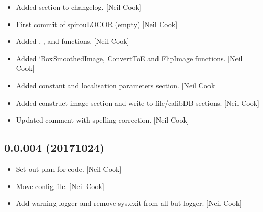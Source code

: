 \documentclass[a4paper,10pt,english]{report}
\begin{document}
\begin{itemize}
\item {} 
Added  section to changelog. {[}Neil Cook{]}

\item {} 
First commit of spirouLOCOR (empty) {[}Neil Cook{]}

\item {} 
Added , , and  functions.
{[}Neil Cook{]}

\item {} 
Added ‘BoxSmoothedImage, ConvertToE and FlipImage functions. {[}Neil
Cook{]}

\item {} 
Added  constant and localisation parameters section. {[}Neil
Cook{]}

\item {} 
Added construct image  section and write  to
file/calibDB sections. {[}Neil Cook{]}

\item {} 
Updated comment with spelling correction. {[}Neil Cook{]}

\end{itemize}


\subsection{0.0.004 (2017\sphinxhyphen{}10\sphinxhyphen{}24)}
\label{\detokenize{misc/changelog:id565}}\begin{itemize}
\item {} 
Set out plan for code. {[}Neil Cook{]}

\item {} 
Move config file. {[}Neil Cook{]}

\item {} 
Add warning logger and remove sys.exit from all but logger. {[}Neil
Cook{]}

\end{itemize}
\end{document}
